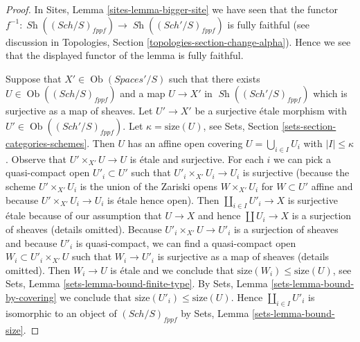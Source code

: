 \documentclass[10pt,a4paper]{amsart}
\theoremstyle{plain}
\theoremstyle{definition}
\theoremstyle{remark}
\numberwithin{equation}{subsection}
\def\Sch{\mathit{Sch}}
\def\Ob{\mathop{\mathrm{Ob}}\nolimits}
\def\Sh{\mathop{\mathit{Sh}}\nolimits}
\begin{document}
\begin{proof}
In Sites, Lemma \ref{sites-lemma-bigger-site} we have seen that the functor
$f^{-1} : \Sh((\Sch/S)_{fppf}) \to \Sh((\Sch'/S)_{fppf})$
is fully faithful (see discussion in
Topologies, Section \ref{topologies-section-change-alpha}).
Hence we see that the displayed functor of the lemma is fully faithful.

\medskip\noindent
Suppose that $X' \in \Ob(\textit{Spaces}'/S)$ such that there exists
$U \in \Ob((\Sch/S)_{fppf})$ and a map $U \to X'$ in
$\Sh((\Sch'/S)_{fppf})$ which is surjective as a map of sheaves.
Let $U' \to X'$ be a surjective \'etale morphism with
$U' \in \Ob((\Sch'/S)_{fppf})$. Let $\kappa = \text{size}(U)$, see
Sets, Section \ref{sets-section-categories-schemes}.
Then $U$ has an affine open covering $U = \bigcup_{i \in I} U_i$
with $|I| \leq \kappa$. Observe that $U' \times_{X'} U \to U$ is \'etale
and surjective. For each $i$ we can pick a quasi-compact
open $U'_i \subset U'$ such that $U'_i \times_{X'} U_i \to U_i$
is surjective (because the scheme $U' \times_{X'} U_i$ is the
union of the Zariski opens $W \times_{X'} U_i$ for $W \subset U'$
affine and because $U' \times_{X'} U_i \to U_i$ is \'etale hence open).
Then $\coprod_{i \in I} U'_i \to X$ is surjective \'etale
because of our assumption that $U \to X$ and hence $\coprod U_i \to X$
is a surjection of sheaves (details omitted).
Because $U'_i \times_{X'} U \to U'_i$ is a surjection of sheaves
and because $U'_i$ is quasi-compact,
we can find a quasi-compact open $W_i \subset U'_i \times_{X'} U$
such that $W_i \to U'_i$ is surjective as a map of sheaves
(details omitted). Then $W_i \to U$ is \'etale and we conclude
that $\text{size}(W_i) \leq \text{size}(U)$, see
Sets, Lemma \ref{sets-lemma-bound-finite-type}. By
Sets, Lemma \ref{sets-lemma-bound-by-covering} we conclude
that $\text{size}(U'_i) \leq \text{size}(U)$.
Hence $\coprod_{i \in I} U'_i$ is isomorphic to an object of
$(\Sch/S)_{fppf}$ by Sets, Lemma \ref{sets-lemma-bound-size}.


\end{proof}
\end{document}
